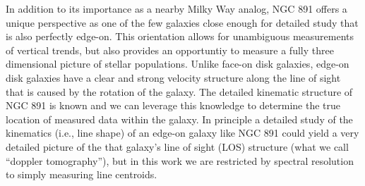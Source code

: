 

In addition to its importance as a nearby Milky Way analog, NGC 891
offers a unique perspective as one of the few galaxies close enough
for detailed study that is also perfectly edge-on. This orientation
allows for unambiguous measurements of vertical trends, but also
provides an opportuntiy to measure a fully three dimensional picture
of stellar populations. Unlike face-on disk galaxies, edge-on disk
galaxies have a clear and strong velocity structure along the line of
sight that is caused by the rotation of the galaxy. The detailed
kinematic structure of NGC 891 is known
\citep{Swaters97,Kregel05,Oosterloo07} and we can leverage this
knowledge to determine the true location of measured data within the
galaxy. In principle a detailed study of the kinematics (i.e., line
shape) of an edge-on galaxy like NGC 891 could yield a very detailed
picture of the that galaxy's line of sight (LOS) structure (what we
call ``doppler tomography''), but in this work we are restricted by
spectral resolution to simply measuring line centroids.


